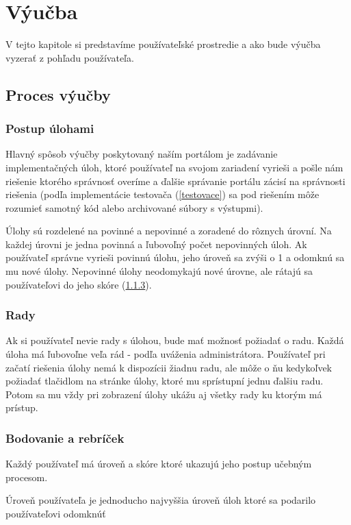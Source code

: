 \chapter{Výučba}

\label{kap:front}

V tejto kapitole si predstavíme používateľské prostredie a ako bude výučba vyzerať
z pohľadu používateľa.

\section{Proces výučby}
\subsection{Postup úlohami}
Hlavný spôsob výučby poskytovaný naším portálom je zadávanie implementačných úloh,
ktoré používateľ na svojom zariadení vyrieši a pošle nám riešenie ktorého správnosť
overíme a ďalšie správanie portálu zácisí na správnosti riešenia
(podľa implementácie testovača (\ref{testovace}) sa pod riešením môže rozumieť
samotný kód alebo archivované súbory s výstupmi).

Úlohy sú rozdelené na povinné a nepovinné a zoradené do rôznych úrovní.
Na každej úrovni je jedna povinná a ľubovoľný počet nepovinných úloh.
Ak používateľ správne vyrieši povinnú úlohu, jeho úroveň sa zvýši o 1 a
odomknú sa mu nové úlohy. Nepovinné úlohy neodomykajú nové úrovne, ale rátajú
sa používateľovi do jeho skóre (\ref{score}).

\subsection{Rady}
Ak si používateľ nevie rady s úlohou, bude mať možnosť požiadať o radu. Každá úloha
má ľubovoľne veľa rád - podľa uváženia administrátora. Používateľ pri začatí riešenia
úlohy nemá k dispozícii žiadnu radu, ale môže o ňu kedykoľvek požiadať tlačidlom na
stránke úlohy, ktoré mu sprístupní jednu ďalšiu radu.
Potom sa mu vždy pri zobrazení úlohy ukážu aj všetky rady ku ktorým má prístup.

\newpage
\subsection{Bodovanie a rebríček}
\label{score}
Každý používateľ má úroveň a skóre ktoré ukazujú jeho postup učebným procesom.

Úroveň používateľa je jednoducho najvyššia úroveň úloh ktoré sa podarilo používateľovi odomknúť

